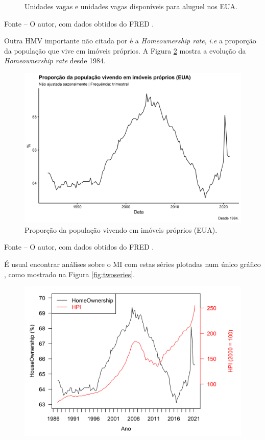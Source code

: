 \documentclass[
	12pt,				%
	oneside,			%
	a4paper,			%
	chapter=TITLE,		%
	section=TITLE,		%
	english,			%
	brazil				%
	]{abntex2}
\newcommand{\bcenter}{\begin{center}}
\newcommand{\ecenter}{\end{center}}
\begin{document}
\begin{refsection}
\begin{figure}[H]
{}

\caption{Unidades vagas e unidades vagas disponíveis para aluguel nos EUA.}\label{fig:vacancy}
\end{figure}
\bcenter

\small Fonte -- O autor, com dados obtidos do FRED \autocite{ERENTUSQ176N,EVACANTUSQ176N}.
\ecenter

Outra \gls{HMV} importante não citada por \textcite{macroHousing} é a \emph{Homeownership rate},
\emph{i.e} a proporção da população que vive em imóveis próprios. A Figura
\ref{fig:USHOWN} mostra a evolução da \emph{Homeownership rate} desde 1984.
\begin{figure}[H]

{\centering \includegraphics[width=0.7\linewidth]{images/USHOWN-1} 

}

\caption{Proporção da população vivendo em imóveis próprios (\gls{EUA}).}\label{fig:USHOWN}
\end{figure}
\bcenter

\small Fonte -- O autor, com dados obtidos do FRED \autocite{RSAHORUSQ156S}.
\ecenter

É usual encontrar análises sobre o \gls{MI} com estas séries plotadas num
único gráfico \autocites[ver][]{FRED2014}{FRED2016}{FRED2018}, como mostrado na Figura
\ref{fig:twoseries}.
\begin{figure}[H]

{\centering \includegraphics[width=1\linewidth]{images/twoseries-1} 

}
\end{figure}
\end{refsection}
\end{document}
